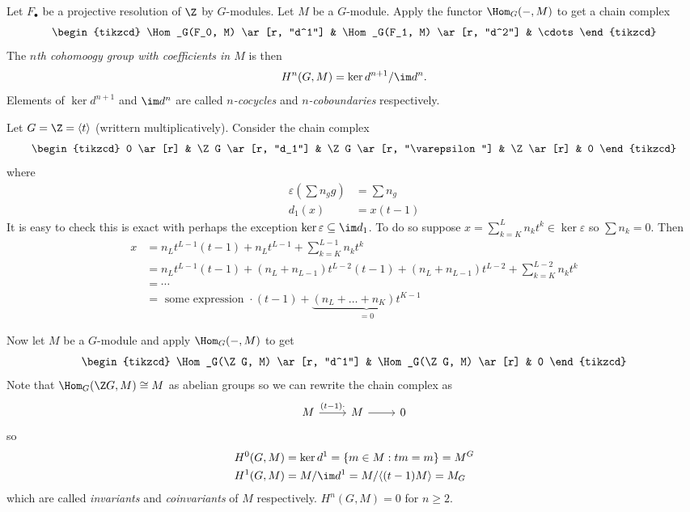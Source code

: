 \documentclass[a4paper]{article}
\begin{document}
\begin{definition}
  Let \(F_\bullet\) be a projective resolution of \(\Z\) by \(G\)-modules. Let \(M\) be a \(G\)-module. Apply the functor \(\Hom_G(-, M)\) to get a chain complex
  \[
    \begin{tikzcd}
      \Hom_G(F_0, M) \ar[r, "d^1"] & \Hom_G(F_1, M) \ar[r, "d^2"] & \cdots
    \end{tikzcd}
  \]
  The \emph{\(n\)th cohomoogy group with coefficients in \(M\)} is then
  \[
    H^n(G, M) = \ker d^{n + 1}/\im d^n.
  \]
  Elements of \(\ker d^{n + 1}\) and \(\im d^n\) are called \emph{\(n\)-cocycles} and \emph{\(n\)-coboundaries} respectively.
\end{definition}

\begin{eg}
  Let \(G = \Z = \langle t\rangle\) (writtern multiplicatively). Consider the chain complex
  \[
    \begin{tikzcd}
      0 \ar[r] & \Z G \ar[r, "d_1"] & \Z G \ar[r, "\varepsilon"] & \Z \ar[r] & 0
    \end{tikzcd}
  \]
  where
  \begin{align*}
    \varepsilon(\sum n_g g) &= \sum n_g \\
    d_1(x) &= x(t - 1)
  \end{align*}
  It is easy to check this is exact with perhaps the exception \(\ker \varepsilon \subseteq \im d_1\). To do so suppose \(x = \sum_{k = K}^L n_k t^k \in \ker \varepsilon\) so \(\sum n_k = 0\). Then
  \begin{align*}
    x &= n_L t^{L - 1} (t - 1) + n_L t^{L - 1} + \sum_{k = K}^{L - 1} n_k t^k \\
      &= n_L t^{L - 1} (t - 1) + (n_L + n_{L - 1})t^{L - 2} (t - 1) + (n_L + n_{L - 1})t^{L - 2} + \sum_{k = K}^{L - 2} n_k t^k \\
      &= \cdots \\
      &= \text{ some expression } \cdot (t - 1) + \underbrace{(n_L + \dots + n_K) t^{K - 1}}_{= 0}
  \end{align*}

  Now let \(M\) be a \(G\)-module and apply \(\Hom_G(-, M)\) to get
  \[
    \begin{tikzcd}
      \Hom_G(\Z G, M) \ar[r, "d^1"] & \Hom_G(\Z G, M) \ar[r] & 0
    \end{tikzcd}
  \]
  Note that \(\Hom_G(\Z G, M) \cong M\) as abelian groups so we can rewrite the chain complex as
  \[
    \begin{tikzcd}
      M \ar[r, "(t - 1) \cdot "] & M \ar[r] & 0
    \end{tikzcd}
  \]
  so
  \begin{align*}
    H^0(G, M) &= \ker d^1 = \{m \in M: tm = m\} = M^G \\
    H^1(G, M) &= M/\im d^1 = M/\langle (t - 1) M\rangle = M_G
  \end{align*}
  which are called \emph{invariants} and \emph{coinvariants} of \(M\) respectively. \(H^n(G, M) = 0\) for \(n \geq 2\).
\end{eg}
\end{document}
